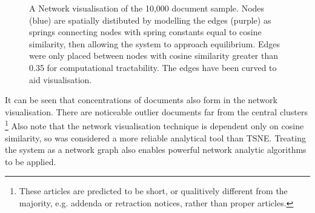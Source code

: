 \begin{center}
\begin{figure}[H]
\label{fig:gephi_exp}
  \centering
    \caption{A Network visualisation of the 10,000 document sample. Nodes (blue) are spatially distibuted by modelling the edges (purple) as springs connecting nodes with spring constants equal to cosine similarity, then allowing the system to approach equilibrium. Edges were only placed between nodes with cosine similarity greater than 0.35 for computational tractability. The edges have been curved to aid visualisation.}
\end{figure} 
\end{center}
It can be seen that concentrations of documents also form in the network visualisation. There are noticeable outlier documents far from the central clusters \footnote{These articles are predicted to be short, or qualitively different from the majority, e.g. addenda or retraction notices, rather than proper articles.} Also note that the network visualisation technique is dependent only on cosine similarity, so was considered a more reliable analytical tool than TSNE. Treating the system as a network graph also enables powerful network analytic algorithms to be applied.
